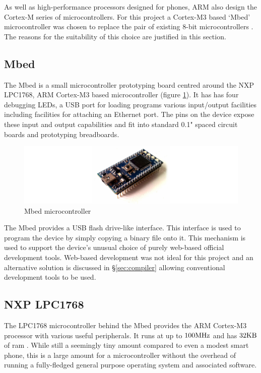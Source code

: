 		As well as high-performance processors designed for phones, ARM also design
		the Cortex-M series of microcontrollers. For this project a Cortex-M3 based
		`Mbed' microcontroller was chosen to replace the pair of existing 8-bit
		microcontrollers \cite{mbed}. The reasons for the suitability of this choice
		are justified in this section.
		
		\subsection{Mbed}
			
			The Mbed is a small microcontroller prototyping board centred around the
			NXP LPC1768, ARM Cortex-M3 based microcontroller (figure \ref{fig:mbed}).
			It has has four debugging LEDs, a USB port for loading programs various
			input/output facilities including facilities for attaching an Ethernet
			port. The pins on the device expose these input and output capabilities
			and fit into standard 0.1" spaced circuit boards and prototyping
			breadboards.
			
			\begin{figure}
				\includegraphics[width=1\textwidth]{diagrams/mbed.pdf}
				\caption{Mbed microcontroller}
				\label{fig:mbed}
			\end{figure}
			
			The Mbed provides a USB flash drive-like interface. This interface is used
			to program the device by simply copying a binary file onto it. This
			mechanism is used to support the device's unusual choice of purely
			web-based official development tools. Web-based development was not ideal
			for this project and an alternative solution is discussed in
			\S\ref{sec:compiler} allowing conventional development tools to be used.
		
		\subsection{NXP LPC1768}
			
			The LPC1768 microcontroller behind the Mbed provides the ARM Cortex-M3
			processor with various useful peripherals. It runs at up to $100\textrm{MHz}$ and
			has $32\textrm{KB}$ of ram \cite{lpc1768}.  While still a seemingly tiny amount
			compared to even a modest smart phone, this is a large amount for a
			microcontroller without the overhead of running a fully-fledged general
			purpose operating system and associated software.
			
